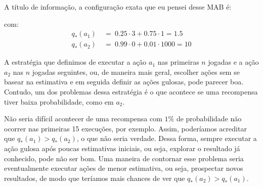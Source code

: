 \documentclass{article}
\begin{document}
            A título de informação, a configuração exata que eu pensei desse MAB é:
            \begin{center}
            \end{center}
            com:
            \begin{equation*}
            \begin{split}
                q_*(a_1) & \ = \ 0.25 \cdot 3 + 0.75 \cdot 1 = 1.5 \\
                q_*(a_2) & \ = \ 0.99 \cdot 0 + 0.01 \cdot 1000 = 10
            \end{split}                
            \end{equation*}

            A estratégia que definimos de executar a ação $a_1$ nas primeiras $n$ jogadas e a ação $a_2$ nas $n$ jogadas seguintes, ou, de maneira mais geral, escolher ações sem se basear na estimativa e em seguida definir as ações gulosas, pode parecer boa. Contudo, um dos problemas dessa estratégia é o que acontece se uma recompensa tiver baixa probabilidade, como em $a_2$. 

            Não seria difícil acontecer de uma recompensa com $1\%$ de probabilidade não ocorrer nas primeiras 15 execuções, por exemplo. Assim, poderíamos acreditar que $q_*(a_1) > q_*(a_2)$, o que não seria verdade. Dessa forma, sempre executar a ação gulosa após poucas estimativas iniciais, ou seja, explorar o resultado já conhecido, pode não ser bom. Uma maneira de contornar esse problema seria eventualmente executar ações de menor estimativa, ou seja, prospectar novos resultados, de modo que teríamos mais chances de ver que $q_*(a_2) > q_*(a_1)$.
\end{document}

